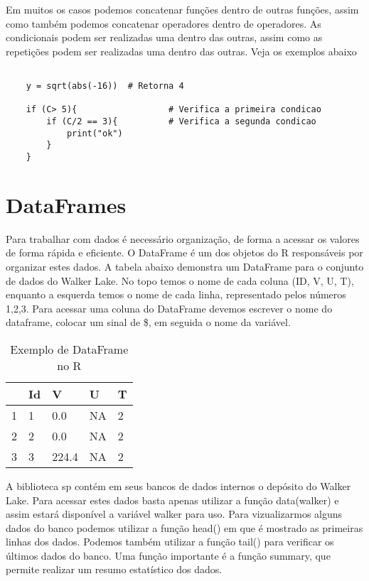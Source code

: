Em muitos os casos podemos concatenar funções dentro de outras funções, assim como também podemos concatenar operadores dentro de operadores. As condicionais podem ser realizadas uma dentro das outras, assim como as repetições podem ser realizadas uma dentro das outras. Veja os exemplos abaixo

\begin{scriptsize}
	\estiloR
	\begin{lstlisting}[caption={Criação de um vetor em R}, label=lst:rcode]
	
	y = sqrt(abs(-16))  # Retorna 4
	
	if (C> 5){					# Verifica a primeira condicao
		if (C/2 == 3){			# Verifica a segunda condicao
			print("ok")
		}
	}
	\end{lstlisting}
\end{scriptsize}


\section{DataFrames} 

Para trabalhar com dados é necessário organização, de forma a acessar os valores de forma rápida e eficiente. O DataFrame é um dos objetos do R responsáveis por organizar estes dados. A tabela abaixo demonstra um DataFrame para o conjunto de dados do Walker Lake. No topo temos o nome de cada coluna (ID, V, U, T), enquanto a esquerda temos o nome de cada linha, representado pelos números 1,2,3. Para acessar uma coluna do DataFrame devemos escrever o nome do dataframe, colocar um sinal de \$, em seguida o nome da variável.  

\FloatBarrier
\begin{table}[h]
	\centering
	\begin{tabular}{@{}lllll@{}}
		\toprule
		& Id & V & U & T \\ \midrule
		1 & 1 & 0.0 & NA & 2 \\
		2 & 2 & 0.0 & NA & 2 \\
		3 & 3 & 224.4 & NA & 2 \\ \bottomrule
	\end{tabular}
	\caption{Exemplo de DataFrame no R}
	\label{tab:my-table}
\end{table}
\FloatBarrier

A biblioteca sp contém em seus bancos de dados internos o depósito do Walker Lake. Para acessar estes dados basta apenas utilizar a função data(walker) e assim estará disponível a variável walker para uso. Para vizualizarmos alguns dados do banco podemos utilizar a função head() em que é mostrado as primeiras linhas dos dados. Podemos também utilizar a função tail() para verificar os últimos dados do banco. Uma função importante é a função summary, que permite realizar um resumo estatístico dos dados. 

